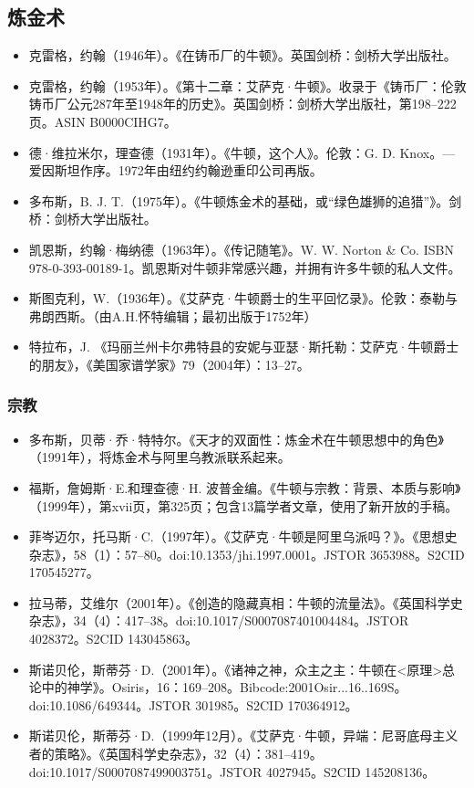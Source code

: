 \subsection{炼金术}
\begin{itemize}
\item 克雷格，约翰（1946年）。《在铸币厂的牛顿》。英国剑桥：剑桥大学出版社。
\item 克雷格，约翰（1953年）。《第十二章：艾萨克·牛顿》。收录于《铸币厂：伦敦铸币厂公元287年至1948年的历史》。英国剑桥：剑桥大学出版社，第198–222页。ASIN B0000CIHG7。
\item 德·维拉米尔，理查德（1931年）。《牛顿，这个人》。伦敦：G. D. Knox。— 爱因斯坦作序。1972年由纽约约翰逊重印公司再版。
\item 多布斯，B. J. T.（1975年）。《牛顿炼金术的基础，或“绿色雄狮的追猎”》。剑桥：剑桥大学出版社。
\item 凯恩斯，约翰·梅纳德（1963年）。《传记随笔》。W. W. Norton & Co. ISBN 978-0-393-00189-1。凯恩斯对牛顿非常感兴趣，并拥有许多牛顿的私人文件。
\item 斯图克利，W.（1936年）。《艾萨克·牛顿爵士的生平回忆录》。伦敦：泰勒与弗朗西斯。（由A.H.怀特编辑；最初出版于1752年）
\item 特拉布，J. 《玛丽兰州卡尔弗特县的安妮与亚瑟·斯托勒：艾萨克·牛顿爵士的朋友》，《美国家谱学家》79（2004年）：13–27。
\end{itemize}
\subsubsection{宗教}
\begin{itemize}
\item 多布斯，贝蒂·乔·特特尔。《天才的双面性：炼金术在牛顿思想中的角色》（1991年），将炼金术与阿里乌教派联系起来。
\item 福斯，詹姆斯·E.和理查德·H. 波普金编。《牛顿与宗教：背景、本质与影响》（1999年），第xvii页，第325页；包含13篇学者文章，使用了新开放的手稿。
\item 菲岑迈尔，托马斯·C.（1997年）。《艾萨克·牛顿是阿里乌派吗？》。《思想史杂志》，58（1）：57–80。doi:10.1353/jhi.1997.0001。JSTOR 3653988。S2CID 170545277。
\item 拉马蒂，艾维尔（2001年）。《创造的隐藏真相：牛顿的流量法》。《英国科学史杂志》，34（4）：417–38。doi:10.1017/S0007087401004484。JSTOR 4028372。S2CID 143045863。
\item 斯诺贝伦，斯蒂芬·D.（2001年）。《诸神之神，众主之主：牛顿在<原理>总论中的神学》。Osiris，16：169–208。Bibcode:2001Osir...16..169S。doi:10.1086/649344。JSTOR 301985。S2CID 170364912。
\item 斯诺贝伦，斯蒂芬·D.（1999年12月）。《艾萨克·牛顿，异端：尼哥底母主义者的策略》。《英国科学史杂志》，32（4）：381–419。doi:10.1017/S0007087499003751。JSTOR 4027945。S2CID 145208136。
\end{itemize}
